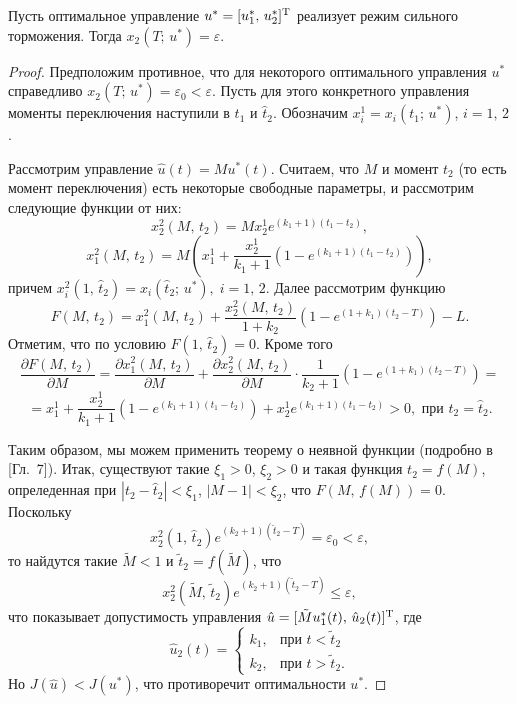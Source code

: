 \begin{assertion}
        Пусть оптимальное управление $u^* = [u_1^*,\,u_2^*]^{\mathrm{T}}$ реализует режим сильного торможения. Тогда $x_2(T;\,u^*) = \varepsilon$.
\end{assertion}
\begin{proof}
        Предположим противное, что для некоторого оптимального управления $u^*$справедливо $x_2(T;\,u^*) = \varepsilon_0 < \varepsilon$. Пусть для этого конкретного управления моменты переключения наступили в $t_1$ и $\hat t_2$. Обозначим $x_i^1 = x_i(t_1;\,u^*)$, $i = 1,\,2$.

        Рассмотрим управление $\hat u(t) = Mu^*(t)$. Считаем, что $M$ и момент $t_2$ (то есть момент переключения) есть некоторые свободные параметры, и рассмотрим следующие функции от них:
        $$
                x_2^2(M,\,t_2) = Mx_2^1e^{(k_1+1)(t_1-t_2)},
        $$
        $$
                x_1^2(M,\,t_2) = M \left(x_1^1+\frac{x_2^1}{k_1+1}\left(1 - e^{(k_1 +1)(t_1 - t_2)}\right)\right),
        $$
        причем $x_i^2(1,\,\hat t_2) = x_i(\hat t_2;\,u^*),\;i=1,\,2$. Далее рассмотрим функцию
        $$
                F(M,\,t_2) = x_1^2(M,\,t_2) + \frac{x_2^2(M,\,t_2)}{1+k_2}\left(1 - e^{(1+k_1)(t_2 - T)}\right) - L.
        $$
        Отметим, что по условию $F(1,\,\hat t_2) = 0$. Кроме того
        $$
                \frac{\partial F(M,\,t_2)}{\partial M} = \frac{\partial x_1^2(M,\,t_2)}{\partial M} + \frac{\partial x_2^2(M,\,t_2)}{\partial M}\cdot\frac1{k_2+1}\left(1 - e^{(1+k_1)(t_2-T)}\right) =
        $$
        $$
                = x_1^1 + \frac{x_2^1}{k_1 + 1}\left(1 - e^{(k_1 + 1)(t_1-t_2)}\right) + x_2^1e^{(k_1+1)(t_1-t_2)} > 0, \mbox{ при $t_2 = \hat t_2$.}
        $$

        Таким образом, мы можем применить теорему о неявной функции (подробно в \cite{zorich}[Гл.~7]). Итак, существуют такие $\xi_1 > 0$, $\xi_2 > 0$ и такая функция $t_2 = f(M)$, опреледенная при $|t_2 - \hat t_2| < \xi_1$, $|M - 1| < \xi_2$, что $F(M,\,f(M)) = 0$. Поскольку
        $$
                x_2^2(1,\,\hat t_2)e^{(k_2+1)(\hat t_2 - T)} = \varepsilon_0 < \varepsilon,
        $$
        то найдутся такие $\tilde M < 1$ и $\tilde t_2 = f(\tilde M)$, что
        $$
                x_2^2(\tilde M,\,\tilde t_2)e^{(k_2+1)(\tilde t_2 - T)} \leqslant \varepsilon,
        $$
        что показывает допустимость управления $\hat u = [\tilde Mu_1^*(t),\,\hat u_2(t)]^{\mathrm{T}}$, где
        $$
                \hat u_2(t) =
                \begin{cases}
                k_1, &\mbox{при $t < \tilde t_2$}\\
                k_2, &\mbox{при $t> \tilde t_2$}.
                \end{cases}
        $$
        Но $J(\hat u) < J(u^*)$, что противоречит оптимальности $u^*$.
\end{proof}

